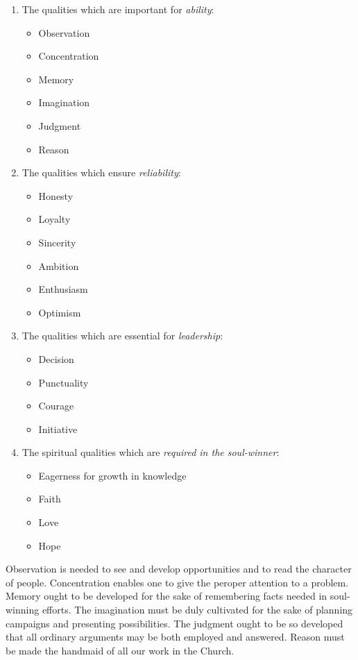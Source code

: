 \documentclass[
]{book}
\providecommand{\tightlist}{%
  \setlength{\itemsep}{0pt}\setlength{\parskip}{0pt}}
\begin{document}
\begin{enumerate}
\def\labelenumi{\arabic{enumi}.}
\tightlist
\item
  The qualities which are important for \emph{ability}:

  \begin{itemize}
  \tightlist
  \item
    Observation
  \item
    Concentration
  \item
    Memory
  \item
    Imagination
  \item
    Judgment
  \item
    Reason
  \end{itemize}
\item
  The qualities which ensure \emph{reliability}:

  \begin{itemize}
  \tightlist
  \item
    Honesty
  \item
    Loyalty
  \item
    Sincerity
  \item
    Ambition
  \item
    Enthusiasm
  \item
    Optimism
  \end{itemize}
\item
  The qualities which are essential for \emph{leadership}:

  \begin{itemize}
  \tightlist
  \item
    Decision
  \item
    Punctuality
  \item
    Courage
  \item
    Initiative
  \end{itemize}
\item
  The spiritual qualities which are \emph{required in the soul-winner}:

  \begin{itemize}
  \tightlist
  \item
    Eagerness for growth in knowledge
  \item
    Faith
  \item
    Love
  \item
    Hope
  \end{itemize}
\end{enumerate}

Observation is needed to see and develop opportunities and to read the character of people. Concentration enables one to give the peroper attention to a problem. Memory ought to be developed for the sake of remembering facts needed in soul-winning efforts. The imagination must be duly cultivated for the sake of planning campaigns and presenting possibilities. The judgment ought to be so developed that all ordinary arguments may be both employed and answered. Reason must be made the handmaid of all our work in the Church.
\end{document}
